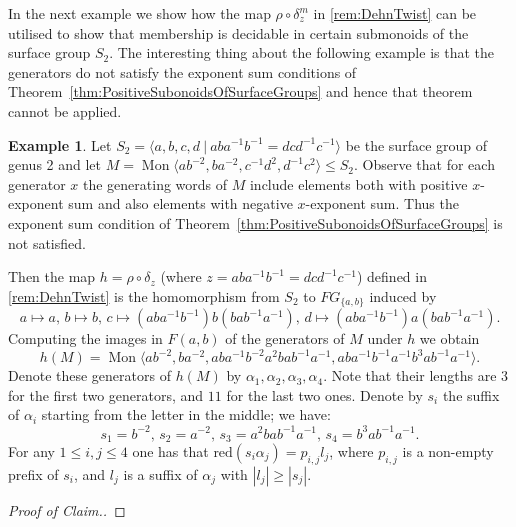 \documentclass[11pt]{amsart}
\newcommand{\Mgen}[1]{\operatorname{Mon}\bigl\langle #1 \bigr\rangle}
\newcommand{\Gpres}[2]{\bigl\langle #1\:|\:#2 \bigr\rangle}
\theoremstyle{plain}
\theoremstyle{definition}
\newtheorem{example}[theorem]{Example}
\begin{document}
In the next example we show how the map $\rho \circ \delta_z^m$ in \cref{rem:DehnTwist} can be utilised to show that membership is decidable in certain submonoids of the surface group $S_2$. The interesting thing about the following example is that the generators do not satisfy the exponent sum conditions of Theorem~\ref{thm:PositiveSubonoidsOfSurfaceGroups} and hence that theorem cannot be applied. 


\begin{example}\label{Ex:table} 
Let 
$S_2 = \Gpres{a,b,c,d}{aba^{-1}b^{-1} = dcd^{-1}c^{-1}}$
be the surface group of genus 2 and let 
$M = \Mgen{ab^{-2}, ba^{-2}, c^{-1}d^{2}, d^{-1}c^{2}} \leq S_2$. 
Observe that for each generator $x$ the generating words of $M$ include elements both with positive $x$-exponent sum and also elements with negative $x$-exponent sum. Thus       
the exponent sum condition of Theorem~\ref{thm:PositiveSubonoidsOfSurfaceGroups} is not satisfied. 

Then the map $h = \rho \circ \delta_z$ (where $z = aba^{-1}b^{-1} = dcd^{-1}c^{-1}$) 
defined in \cref{rem:DehnTwist} is the homomorphism 
from $S_2$ to $FG_{ \{ a,b \}}$ induced by
\[
  a \mapsto a, \, b \mapsto b, \, 
  c \mapsto (aba^{-1}b^{-1})b(bab^{-1}a^{-1}), \, 
  d \mapsto (aba^{-1}b^{-1})a(bab^{-1}a^{-1}).  
\]
Computing the images in $F(a,b)$ of the generators of $M$ under $h$ we obtain 
\[
h(M) = \Mgen{ab^{-2}, ba^{-2}, aba^{-1}b^{-2}a^{2}bab^{-1}a^{-1}, aba^{-1}b^{-1}a^{-1}b^{3}ab^{-1}a^{-1}}.
\]
Denote these generators of $h(M)$ by $\alpha_1, \alpha_2, \alpha_3, \alpha_4$. Note that their lengths are $3$ for the first two generators, and $11$ for the last two ones. Denote by $s_i$ the suffix of $\alpha_i$ starting from the letter in the middle; we have:
\[
s_1 = b^{-2},\, s_2 = a^{-2},\, s_3 = a^{2}bab^{-1}a^{-1},\, s_4 =  b^{3}ab^{-1}a^{-1}.
\]
 For any $1 \leq i, j \leq 4$ one has that $\text{red}(s_i \alpha_j) = p_{i, j}l_j$, where $p_{i, j}$ is a non-empty prefix of $s_i$, and $l_j$ is a suffix of $\alpha_j$ with $|l_j| \geq |s_j|$. 
\begin{proof}[Proof of Claim.] 


\end{proof}
\end{example}
\end{document}
